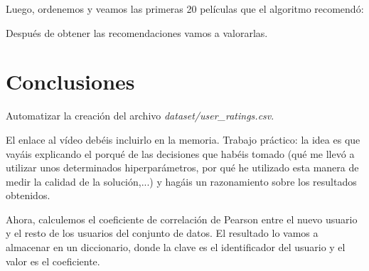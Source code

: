 \documentclass{uimppracticas}
\begin{document}
Luego, ordenemos y veamos las primeras 20 películas que el algoritmo recomendó:




Después de obtener las recomendaciones vamos a valorarlas. 

\newpage

\section{Conclusiones}

Automatizar la creación del archivo \textit{dataset/user\_ratings.csv}.

El enlace al vídeo debéis incluirlo en la memoria. Trabajo práctico: la idea es que vayáis explicando el porqué de las decisiones que habéis tomado (qué me llevó a utilizar unos determinados hiperparámetros, por qué he utilizado esta manera de medir la calidad de la solución,...) y hagáis un razonamiento sobre los resultados obtenidos.

Ahora, calculemos el coeficiente de correlación de Pearson entre el nuevo usuario y el resto de los usuarios del conjunto de datos. El resultado lo vamos a almacenar en un diccionario, donde la clave es el identificador del usuario y el valor es el coeficiente.


\newpage

\renewcommand{\refname}{Bibliografía}


	
\end{document}
